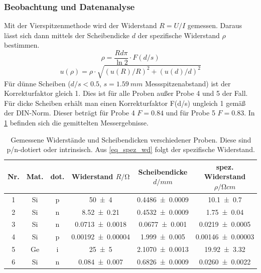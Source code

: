 \documentclass[
	a4paper,
	12pt,
	pagesize,
	ngerman
]{scrartcl}
\begin{document}
	\subsubsection{Beobachtung und Datenanalyse}

	Mit der Vierspitzenmethode wird der Widerstand $R=U/I$ gemessen.
	Daraus lässt sich dann mittels der Scheibendicke $d$ der spezifische Widerstand $\rho$ bestimmen.
	\begin{equation}
			\rho = \frac{R d \pi}{\ln 2} \cdot F(d/s)
			\label{eq_spez_wd}
	\end{equation}
	\begin{equation}
			u(\rho) = \rho\cdot\sqrt{(u(R)/R)^2 + (u(d)/d)^2}
	\end{equation}
	Für dünne Scheiben ($d/s<0.5$, $s=\SI{1.59}{mm}$ Messspitzenabstand) ist der Korrekturfaktor gleich 1.
	Dies ist für alle Proben außer Probe 4 und 5 der Fall.
	Für dicke Scheiben erhält man einen Korrekturfaktor F(d/s) ungleich 1 gemäß der DIN-Norm\cite{DIN50431}.
	Dieser beträgt für Probe 4 $F=0.84$ und für Probe 5 $F=0.83$.
	In \cref{tb_spez_wd} befinden sich die gemittelten Messergebnisse.

	\begin{table}[H]
		\centering
		\begin{tabular}{c | c | c | c | c | c  }
			 Nr.& Mat. & dot. & Widerstand $R/\si{\ohm}$& Scheibendicke $d/\si{mm}$ & spez. Widerstand $\rho/\si{\ohm cm}$ \\ \hline %
			 1& Si& p& \SI{50+-4}{}&\SI{0.4486+-0.0009}{}& \SI{10.1+-0.7}{} \\
			 2& Si& n&\SI{8.52+-0.21}{}&\SI{0.4532+-0.0009}{}&\SI{1.75+-0.04}{} \\
			 3& Si& n&\SI{0.0713+-0.0018}{}&\SI{0.0677+-0.001}{}&\SI{0.0219+-0.0005}{} \\
			 4& Si& p&\SI{0.00192+-0.00004}{}&\SI{1.999+-0.005}{}&\SI{0.00146+-0.00003}{} \\ %
			 5& Ge& i&\SI{25+-5}{}&\SI{2.1070+-0.0013}{}&\SI{19.92+-3.32}{}  \\ %
			 6& Si& n&\SI{0.084+-0.007}{}&\SI{0.6826+-0.0009}{}&\SI{0.0260+-0.0022}{} \\
		\end{tabular}
		\caption{
		Gemessene Widerstände und Scheibendicken verschiedener Proben.
		Diese sind p/n-dotiert oder intrinsisch.
		Aus \cref{eq_spez_wd} folgt der spezifische Widerstand.
		}
		\label{tb_spez_wd}
	\end{table}
\end{document}
